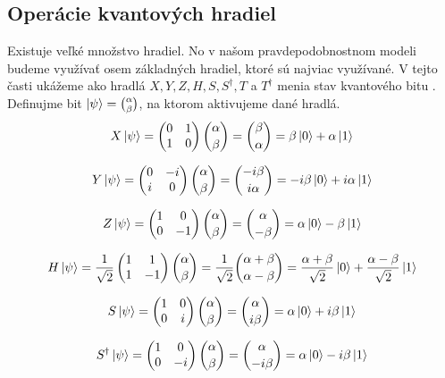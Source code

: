 \subsection{Operácie kvantových hradiel}
\label{op_kvan_hradiel}
Existuje veľké množstvo hradiel. No v našom pravdepodobnostnom modeli budeme
využívať osem základných hradiel, ktoré sú najviac využívané. V tejto časti
ukážeme ako hradlá \(X, Y, Z, H, S, S^{\dag}, T\) a \(T^{\dag}\) menia stav
kvantového bitu \cite{Nie+00}. Definujme bit \(\ket{\psi} = \binom{\alpha}{\beta}\), na 
ktorom aktivujeme dané hradlá.
\[X\ket{\psi} = 
\begin{pmatrix}
0 & 1 \\
1 & 0 \\
\end{pmatrix}\binom{\alpha}{\beta} = \binom{\beta}{\alpha} = \beta\ket{0} + \alpha\ket{1}\]

\[Y\ket{\psi} = 
\begin{pmatrix}
0 & -i \\
i & 0 \\
\end{pmatrix}\binom{\alpha}{\beta} = \binom{-i\beta}{i\alpha} = -i\beta\ket{0} + i\alpha\ket{1}\]

\[Z\ket{\psi} = 
\begin{pmatrix}
1 & 0 \\
0 & -1 \\
\end{pmatrix}\binom{\alpha}{\beta} = \binom{\alpha}{-\beta} = \alpha\ket{0} - \beta\ket{1}\]

\[H\ket{\psi} = \frac{1}{\sqrt{2}}
\begin{pmatrix}
1 & 1 \\
1 & -1 \\
\end{pmatrix}\binom{\alpha}{\beta} = \frac{1}{\sqrt{2}}\binom{\alpha + \beta}{\alpha - \beta} = \frac{\alpha + \beta}{\sqrt{2}}\ket{0} + \frac{\alpha - \beta}{\sqrt{2}}\ket{1}\]

\[S\ket{\psi} = 
\begin{pmatrix}
1 & 0 \\
0 & i \\
\end{pmatrix}\binom{\alpha}{\beta} = \binom{\alpha}{i\beta} = \alpha\ket{0} + i\beta\ket{1}\]

\[S^{\dag}\ket{\psi} = 
\begin{pmatrix}
1 & 0 \\
0 & -i \\
\end{pmatrix}\binom{\alpha}{\beta} = \binom{\alpha}{-i\beta} = \alpha\ket{0} - i\beta\ket{1}\]

